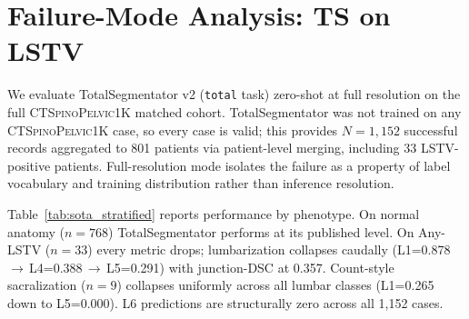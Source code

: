 \documentclass{article}
\newcommand{\dataset}{\textsc{CTSpinoPelvic1K}}
\newcommand{\SOTA}{TotalSegmentator}
\newcommand{\sota}{TS}
\begin{document}
\section{Failure-Mode Analysis: \sota{} on LSTV}
\label{sec:audit}

We evaluate \SOTA{} v2 (\texttt{total} task) zero-shot at
full resolution on the full \dataset{} matched cohort.
\SOTA{} was not trained on any \dataset{} case, so every
case is valid; this provides $N{=}1{,}152$ successful
records aggregated to 801 patients via patient-level
merging, including 33 LSTV-positive patients.
Full-resolution mode isolates the failure as a property of
label vocabulary and training distribution rather than
inference resolution.

Table~\ref{tab:sota_stratified} reports performance by
phenotype. On normal anatomy ($n=768$) \SOTA{} performs at
its published level. On Any-LSTV ($n=33$) every metric
drops; lumbarization collapses caudally
(L1=0.878\,$\to$\,L4=0.388\,$\to$\,L5=0.291) with
junction-DSC at 0.357. Count-style sacralization ($n=9$)
collapses uniformly across all lumbar classes (L1=0.265
down to L5=0.000). \textsc{L6} predictions are
structurally zero across all 1{,}152 cases.
\end{document}
